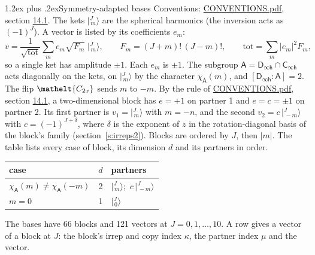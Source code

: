 \documentclass[10pt,a4paper]{article}
\makeatletter
\renewcommand\section{\@startsection{section}{1}{\z@}{-3ex plus -1ex minus -.2ex}%
  {1.2ex plus .2ex}{\normalfont\large\sffamily\bfseries\color{parttitle}}}
\numberwithin{equation}{section}
\newcommand{\eltfont}[1]{{\let\sigma\eltsigma\mathelt{#1}}}
\newcommand{\grp}[1]{\mathsf{#1}}
\newcommand{\elt}[1]{\eltfont{#1}}
\newcommand{\grpindex}[2]{[#1 : #2]}
\newcommand{\chiA}{\chi_{\grp{A}}}
\newcommand{\mult}{\kappa}
\newcommand{\intx}{\mu}
\newcommand{\jm}[2]{\bigl\lvert{}^{#1}_{\,#2}\bigr\rangle}
\makeatother
\begin{document}
\section{Symmetry-adapted bases}\label{s:bases}
Conventions: \href{../../CONVENTIONS.pdf}{CONVENTIONS.pdf}, section \href{../../CONVENTIONS.pdf\#conv.14.1}{14.1}.
\leavevmode\label{n:index.m}\label{n:vector.ket}The kets $\jm{J}{m}$ are the spherical harmonics (the inversion acts as $(-1)^J$). \label{n:index.ketcoefficient}\label{n:vector.basis.symmetry}\label{n:index.ketweight}\label{n:index.total}A vector is listed by its coefficients $e_m$:
\begin{equation}\label{e:ket}v = \frac{1}{\sqrt{\mathrm{tot}}}\sum_m e_m\sqrt{F_m}\;\jm{J}{m},\qquad F_m = (J+m)!\,(J-m)!,\qquad \mathrm{tot} = \sum_m |e_m|^2F_m,\end{equation}
so a single ket has amplitude $\pm1$. Each $e_m$ is $\pm1$.
\leavevmode\label{n:group.A}\label{n:function.character.abelian}The subgroup $\grp{A} = \grp{D_{\infty h}}\cap\grp{C_{\infty h}}$ acts diagonally on the kets, on $\jm{J}{m}$ by the character $\chiA(m)$, and $\grpindex{\grp{D_{\infty h}}}{\grp{A}} = 2$. The flip $\elt{C_{2x}}$ sends $m$ to $-m$. \label{n:index.partner.sign}By the rule of \href{../../CONVENTIONS.pdf}{CONVENTIONS.pdf}, section \href{../../CONVENTIONS.pdf\#conv.14.1}{14.1}, a two-dimensional block has $e = +1$ on partner 1 and $e = c = \pm1$ on partner 2. Its first partner is $v_1 = \jm{J}{m}$ with $m = -n$, and the second $v_2 = c\,\jm{J}{-m}$ with $c = (-1)^{J+\delta}$, where $\delta$ is the exponent of $z$ in the rotation-diagonal basis of the block's family (section~\ref{s:irreps2}). Blocks are ordered by $J$, then $|m|$.
\leavevmode\label{n:head.case}\label{n:head.partners}The table lists every case of block, its dimension $d$ and its partners in order.
\begin{center}\begin{tabular}{@{}lrl@{}}\toprule
case & $d$ & partners\\\midrule
$\chiA(m) \ne \chiA(-m)$ & 2 & $\jm{J}{m}$;\ $c\,\jm{J}{-m}$\\
$m = 0$ & 1 & $\jm{J}{0}$\\
\bottomrule\end{tabular}\end{center}
The bases have 66 blocks and 121 vectors at $J = 0, 1, \dots, 10$. \label{n:index.copy}\label{n:head.irrep}\label{n:head.vector}A row gives a vector of a block at $J$: the block's irrep and copy index $\mult$, the partner index $\intx$ and the vector.
\end{document}
